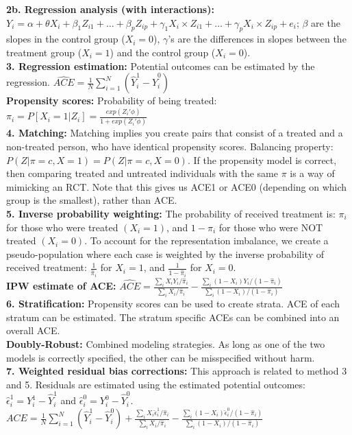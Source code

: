 \documentclass[a4paper,7pt,landscape]{extarticle}
\begin{document}
\begin{multicols}{3}
\begin{boxA}
\textbf{2b. Regression analysis (with interactions):} $Y_i = \alpha+\theta X_i + \beta_1 Z_{i1}+…+\beta_p Z_{ip}+ \gamma_1 X_i \times Z_{i1}+…+ \gamma_p X_i \times Z_{ip}+e_i$; $\beta$ are the slopes in the control group ($X_i=0$), $\gamma$'s are the differences in slopes between the treatment group ($X_i=1$) and the control group ($X_i=0$).\\
\textbf{3. Regression estimation:} Potential outcomes can be estimated by the regression. $\hat{ACE} = \frac{1}{N} \sum_{i=1}^N (\hat{Y}_i^1 - \hat{Y}_i^0)$\\
\textbf{Propensity scores:} Probability of being treated: $\pi_i = P[X_i = 1 | Z_i] = \frac{exp(Z_i' \phi)}{1 + exp(Z_i' \phi)}$\\
\textbf{4. Matching:} Matching implies you create pairs that consist of a treated and a non-treated person, who have identical propensity scores. Balancing property: $P(Z|\pi = c,X = 1) = P(Z|\pi = c,X = 0)$. If the propensity model is correct, then comparing treated and untreated individuals with the same $\pi$ is a way of mimicking an RCT. Note that this gives us ACE1 or ACE0 (depending on which group is the smallest), rather than ACE.\\
\textbf{5. Inverse probability weighting:} The probability of received treatment is: $\pi_i$ for those who were treated $(X_i = 1)$, and $1 - \pi_i$ for those who were NOT treated $(X_i = 0)$. To account for the representation imbalance, we create a pseudo-population where each case is weighted by the inverse probability of received treatment:  $\frac{1}{\hat{\pi}_i}$ for $X_i = 1$, and $\frac{1}{1-\hat{\pi}_i}$ for $X_i = 0$.\\
\textbf{IPW estimate of ACE:} $\hat{ACE} = \frac{\sum_i X_i Y_i / \hat{\pi}_i}{\sum_i X_i / \hat{\pi}_i} - \frac{\sum_i (1-X_i) Y_i / (1 - \hat{\pi}_i)}{\sum_i (1-X_i) / (1- \hat{\pi}_i)}$\\
\textbf{6. Stratification:} Propensity scores can be used to create strata. ACE of each stratum can be estimated. The stratum specific ACEs can be combined into an overall ACE.\\
 \textbf{Doubly-Robust:} Combined modeling strategies. As long as one of the two models is correctly specified, the other can be misspecified without harm.\\
\textbf{7. Weighted residual bias corrections:} This approach is related to method 3 and 5. Residuals are estimated using the estimated potential outcomes: $\hat{\epsilon}_i^1 = Y_i^1 - \hat{Y}_i^1$ and $\hat{\epsilon}_i^0 = Y_i^0 - \hat{Y}_i^0$. $ACE = \frac{1}{N} \sum_{i=1}^N (\hat{Y}_i^1 - \hat{Y}_i^0) + \frac{\sum_i X_i \hat{\epsilon}_i^1 / \hat{\pi}_i}{\sum_i X_i / \hat{\pi}_i} - \frac{\sum_i (1-X_i) \hat{\epsilon}_i^0 / (1 - \hat{\pi}_i)}{\sum_i (1-X_i) / (1- \hat{\pi}_i)}$\\

\end{boxA}
\end{multicols}
\end{document}
